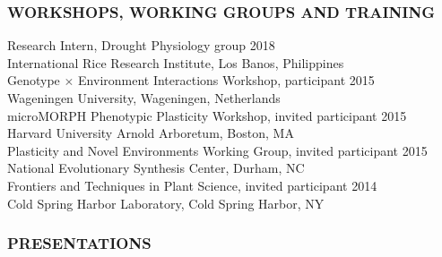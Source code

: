 \documentclass[12pt,english]{article}
\begin{document}
\subsubsection*{WORKSHOPS, WORKING GROUPS AND TRAINING}
\vspace{-0.5ex}
\hspace*{1.0em} Research Intern, Drought Physiology group
\hfill
2018
\vspace{1ex}\\
\hspace*{2.0em}  International Rice Research Institute, Los Banos, Philippines
\vspace{1ex}\\
\hspace*{1.0em} Genotype $\times$ Environment Interactions Workshop, participant
\hfill
2015
\vspace{1ex}\\
\hspace*{2.0em}  Wageningen University, Wageningen, Netherlands
\vspace{1ex}\\
\hspace*{1.0em} microMORPH Phenotypic Plasticity Workshop, invited participant
\hfill
2015
\vspace{1ex}\\
\hspace*{2.0em}  Harvard University Arnold Arboretum, Boston, MA
\vspace{1ex}\\
\hspace*{1.0em} Plasticity and Novel Environments Working Group, invited participant
\hfill
2015
\vspace{1ex}\\
\hspace*{2.0em}  National Evolutionary Synthesis Center, Durham, NC
\vspace{1ex}\\
\hspace*{1.0em} Frontiers and Techniques in Plant Science, invited participant
\hfill
2014
\vspace{1ex}\\
\hspace*{2.0em}  Cold Spring Harbor Laboratory, Cold Spring Harbor, NY
\vspace{1ex}


\subsubsection*{PRESENTATIONS}
\vspace{-0.5ex}
\end{document}
